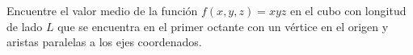 \item Encuentre el valor medio de la función $f(x, y, z) = xyz$ en el cubo con longitud de lado $L$ que se encuentra en el primer octante con un vértice en el origen y aristas paralelas a los ejes coordenados.
